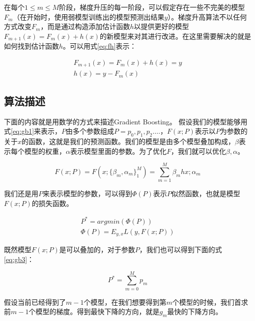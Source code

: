 在每个$1 \le m \le M$阶段，梯度升压的每一阶段，可以假定存在一些不完美的模型$F_m$（在开始时，使用弱模型训练出的模型预测出结果$y$）。梯度升高算法不以任何方式改变$F_m$，而是通过构造添加估计函数$h$以提供更好的模型$F_{m + 1}(x)= F_m(x)+ h(x)$的新模型来对其进行改进。在这里需要解决的就是如何找到估计函数$h$。可以用式\ref{eq:fh}表示：

{\setlength\abovedisplayskip{15pt}
\setlength\belowdisplayskip{15pt}
\begin{eqnarray}
    \label{eq:fh}
    F_{m+1}(x)=F_{m}(x)+h(x)=y \nonumber \\
    h(x) = y - F_m(x)
\end{eqnarray}}

\subsection{算法描述}
下面的内容就是用数学的方式来描述Gradient Boosting。
假设我们的模型能够用式\ref{eq:gb1}来表示，$P$由多个参数组成$P = {p_{0},p_{1},p_{2}….}$，$F(x;P)$表示以$P$为参数的关于$x$的函数，这就是我们的预测函数。我们的模型是由多个模型叠加构成，$\beta$表示每个模型的权重，$\alpha$表示模型里面的参数。为了优化$F$，我们就可以优化${\beta,\alpha}$。

{\setlength\abovedisplayskip{15pt}
\setlength\belowdisplayskip{15pt}
\begin{equation}
    \label{eq:gb1}
    F(x;P)=F(x;\{\beta_{m},\alpha_{m}\}_{1}^{M})=\sum_{m=1}^{M}\beta_{m}h{x;\alpha_{m}}
\end{equation}}

我们还是用$P$来表示模型的参数，可以得到$\Phi(P)$表示$P$似然函数，也就是模型$F(x;P)$的损失函数。

{\setlength\abovedisplayskip{15pt}
\setlength\belowdisplayskip{15pt}
\begin{eqnarray}
    \label{eq:gb2}
    P^{*}=argmin(\Phi(P)) \\
    \Phi(P)=E_{y,x}L(y,F(x;P)) \nonumber
\end{eqnarray}}

既然模型$F(x;P)$是可以叠加的，对于参数$P$，我们也可以得到下面的式\ref{eq:gb3}：

{\setlength\abovedisplayskip{15pt}
\setlength\belowdisplayskip{15pt}
\begin{equation}
    \label{eq:gb3}
    P^{*}=\sum_{m=0}^M p_{m}
\end{equation}}

假设当前已经得到了$m-1$个模型，在我们想要得到第$m$个模型的时候，我们首求前$m-1$个模型的梯度。得到最快下降的方向，就是$g_{m}$最快的下降方向。

